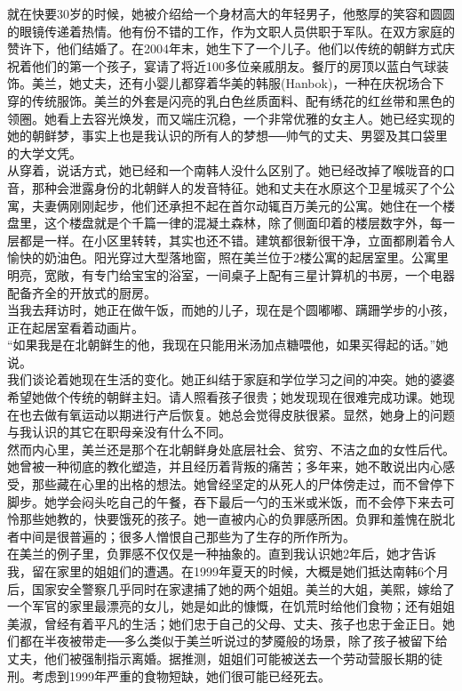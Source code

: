 就在快要30岁的时候，她被介绍给一个身材高大的年轻男子，他憨厚的笑容和圆圆的眼镜传递着热情。他有份不错的工作，作为文职人员供职于军队。在双方家庭的赞许下，他们结婚了。在2004年末，她生下了一个儿子。他们以传统的朝鲜方式庆祝着他们的第一个孩子，宴请了将近100多位亲戚朋友。餐厅的房顶以蓝白气球装饰。美兰，她丈夫，还有小婴儿都穿着华美的韩服(Hanbok)，一种在庆祝场合下穿的传统服饰。美兰的外套是闪亮的乳白色丝质面料、配有绣花的红丝带和黑色的领圈。她看上去容光焕发，而又端庄沉稳，一个非常优雅的女主人。她已经实现的她的朝鲜梦，事实上也是我认识的所有人的梦想──帅气的丈夫、男婴及其口袋里的大学文凭。\\

从穿着，说话方式，她已经和一个南韩人没什么区别了。她已经改掉了喉咙音的口音，那种会泄露身份的北朝鲜人的发音特征。她和丈夫在水原这个卫星城买了个公寓，夫妻俩刚刚起步，他们还承担不起在首尔动辄百万美元的公寓。她住在一个楼盘里，这个楼盘就是个千篇一律的混凝土森林，除了侧面印着的楼层数字外，每一层都是一样。在小区里转转，其实也还不错。建筑都很新很干净，立面都刷着令人愉快的奶油色。阳光穿过大型落地窗，照在美兰位于2楼公寓的起居室里。公寓里明亮，宽敞，有专门给宝宝的浴室，一间桌子上配有三星计算机的书房，一个电器配备齐全的开放式的厨房。\\

当我去拜访时，她正在做午饭，而她的儿子，现在是个圆嘟嘟、蹒跚学步的小孩，正在起居室看着动画片。\\

“如果我是在北朝鲜生的他，我现在只能用米汤加点糖喂他，如果买得起的话。”她说。\\

我们谈论着她现在生活的变化。她正纠结于家庭和学位学习之间的冲突。她的婆婆希望她做个传统的朝鲜主妇。请人照看孩子很贵；她发现现在很难完成功课。她现在也去做有氧运动以期进行产后恢复。她总会觉得皮肤很紧。显然，她身上的问题与我认识的其它在职母亲没有什么不同。\\

然而内心里，美兰还是那个在北朝鲜身处底层社会、贫穷、不洁之血的女性后代。她曾被一种彻底的教化塑造，并且经历着背叛的痛苦；多年来，她不敢说出内心感受，那些藏在心里的出格的想法。她曾经坚定的从死人的尸体傍走过，而不曾停下脚步。她学会闷头吃自己的午餐，吞下最后一勺的玉米或米饭，而不会停下来去可怜那些她教的，快要饿死的孩子。她一直被内心的负罪感所困。负罪和羞愧在脱北者中间是很普遍的；很多人憎恨自己那些为了生存的所作所为。\\

在美兰的例子里，负罪感不仅仅是一种抽象的。直到我认识她2年后，她才告诉我，留在家里的姐姐们的遭遇。在1999年夏天的时候，大概是她们抵达南韩6个月后，国家安全警察几乎同时在家逮捕了她的两个姐姐。美兰的大姐，美熙，嫁给了一个军官的家里最漂亮的女儿，她是如此的慷慨，在饥荒时给他们食物；还有姐姐美淑，曾经有着平凡的生活；她们忠于自己的父母、丈夫、孩子也忠于金正日。她们都在半夜被带走──多么类似于美兰听说过的梦魇般的场景，除了孩子被留下给丈夫，他们被强制指示离婚。据推测，姐姐们可能被送去一个劳动营服长期的徒刑。考虑到1999年严重的食物短缺，她们很可能已经死去。\\

